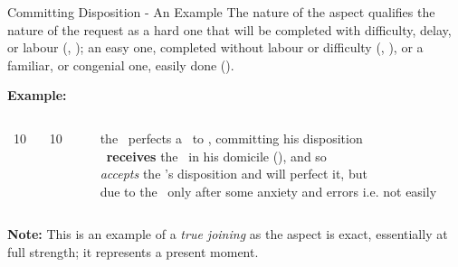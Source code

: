 \begin{frame}[t]{Committing Disposition - An Example}
The nature of the aspect qualifies the nature of the request as a hard one that will be completed with difficulty, delay, or labour (\Square, \Opposition); an easy one, completed without labour or difficulty (\Sextile, \Trine), or a familiar, or congenial one, easily done (\Conjunction).

\textbf{Example:}
\begin{columns}[T, onlytextwidth]
\Sun\ 10 \Aries\ \Square\ \Mars\ 10 \Capricorn

\rule{.1mm}{.20\textheight}

the \Sun\ perfects a \Square\  to \Mars, committing his disposition \\
\Mars\ \textbf{receives} the \Sun\ in his domicile (\Aries), and so \\
\textsl{accepts} the \Sun's disposition and will perfect it, but \\
due to the \Square\ only after some anxiety and errors i.e. not easily
\end{columns}
\vspace{0.5cm}
\textbf{Note:} This is an example of a \textsl{true joining} as the aspect is exact, essentially at full strength; it represents a present moment.

\end{frame}
